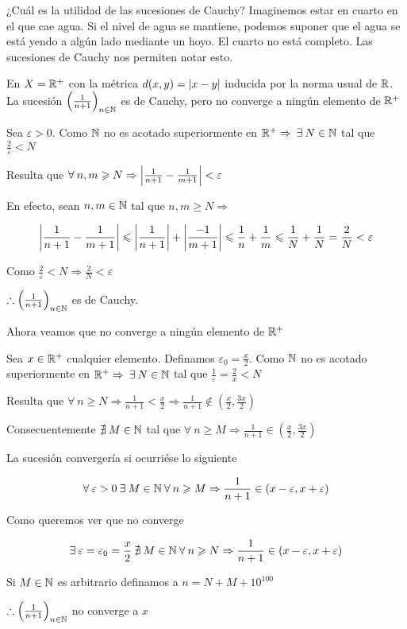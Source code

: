 \begin{remark}
    ¿Cuál es la utilidad de las sucesiones de Cauchy? Imaginemos estar en cuarto en el que cae agua. Si el nivel de agua se mantiene, podemos suponer que el agua se está yendo a algún lado mediante un hoyo. El cuarto no está completo. Las sucesiones de Cauchy nos permiten notar esto.
\end{remark}

\begin{eg}
    En $X = \mathbb{R}^+$ con la métrica $d(x,y) = \abs{x-y}$ inducida por la norma usual de $\mathbb{R}$. La sucesión ${\left( \frac{1}{n+1} \right)}_{n \in \mathbb{N}}$  es de Cauchy, pero no converge a ningún elemento de $\mathbb{R}^+$
\end{eg}

\begin{proofexplanation}
    Sea $\varepsilon > 0$. Como $\mathbb{N}$ no es acotado superiormente en $\mathbb{R}^+ \Rightarrow \: \exists \: N \in \mathbb{N}$ tal que $\frac{2}{\varepsilon} < N$

    Resulta que $\forall \: n, m \geqslant N \Rightarrow \abs{\frac{1}{n+1} - \frac{1}{m+1} } < \varepsilon$

    En efecto, sean $n,m \in \mathbb{N}$ tal que $n, m \geqslant N \Rightarrow$

    $$\abs{\frac{1}{n+1} - \frac{1}{m+1} } \leqslant \abs{\frac{1}{n+1}} +  \abs{\frac{-1}{m+1}} \leqslant \frac{1}{n} + \frac{1}{m} \leqslant \frac{1}{N} + \frac{1}{N} = \frac{2}{N} < \varepsilon$$

    Como $\frac{2}{\varepsilon} < N \Rightarrow \frac{2}{N} < \varepsilon$

    $\therefore {\left( \frac{1}{n+1} \right)}_{n \in \mathbb{N}}$ es de Cauchy.

    Ahora veamos que no converge a ningún elemento de $\mathbb{R}^+$

    Sea $ x \in \mathbb{R}^+$ cualquier elemento. Definamos $\varepsilon_0 = \frac{x}{2}$. Como $\mathbb{N}$ no es acotado superiormente en $\mathbb{R}^+ \Rightarrow \: \exists \: N \in \mathbb{N}$ tal que $\frac{1}{\varepsilon} = \frac{2}{x} < N$

    Resulta que $\forall \: n \geqslant N \Rightarrow \frac{1}{n+1} < \frac{x}{2} \Rightarrow \frac{1}{n+1} \notin \left( \frac{x}{2}, \frac{3x}{2} \right)$

    Consecuentemente $\nexists \: M \in \mathbb{N}$ tal que $\forall \: n \geqslant M \Rightarrow  \frac{1}{n+1} \in \left( \frac{x}{2}, \frac{3x}{2} \right)$

    La sucesión convergería si ocurriése lo siguiente

    $$ \forall \: \varepsilon >0 \: \exists \: M \in \mathbb{N} \: \forall \: n \geqslant M \Rightarrow \frac{1}{n+1} \in ( x - \varepsilon, x + \varepsilon) $$

    Como queremos ver que no converge

    $$\exists \: \varepsilon = \varepsilon_0 = \frac{x}{2} \: \nexists \: M \in \mathbb{N} \: \forall \: n \geqslant N \Rightarrow \frac{1}{n+1} \in ( x - \varepsilon, x + \varepsilon)$$

    Si $M \in \mathbb{N}$ es arbitrario definamos a $n = N + M + 10^{100}$

    $\therefore {\left( \frac{1}{n+1} \right)}_{n \in \mathbb{N}}$ no converge a $x$
\end{proofexplanation}

